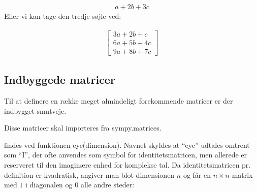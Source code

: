 \documentclass[letterpaper,10pt,english]{jupyterBook}
\begin{document}
\begin{sphinxVerbatim}[commandchars=\\\{\}]
    
\PYG{p}{[} \PYG{p}{]}
\end{sphinxVerbatim}
\begin{equation*}
\begin{split}\displaystyle a + 2 b + 3 c\end{split}
\end{equation*}
Eller vi kan tage den tredje søjle ved:

\begin{sphinxVerbatim}[commandchars=\\\{\}]
\PYG{p}{[} \PYG{p}{]}
\end{sphinxVerbatim}
\begin{equation*}
\begin{split}\displaystyle \left[\begin{matrix}3 a + 2 b + c\\6 a + 5 b + 4 c\\9 a + 8 b + 7 c\end{matrix}\right]\end{split}
\end{equation*}

\subsection{Indbyggede matricer}
\label{\detokenize{notebooks/sympy/Notebook_LinAlg1:indbyggede-matricer}}
Til at definere en række meget almindeligt forekommende matricer er der indbygget smutveje.

Disse matricer skal importeres fra sympy.matrices.

 findes ved funktionen eye(dimension). Navnet skyldes at “eye” udtales omtrent som “I”, der ofte anvendes som symbol for identitetsmatricen, men allerede er reserveret til den imaginære enhed for komplekse tal. Da identitetsmatricen pr. definition er kvadratisk, angiver man blot dimensionen \(n\) og får en \(n\times n\) matrix med \(1\) i diagonalen og \(0\) alle andre steder:
\end{document}
